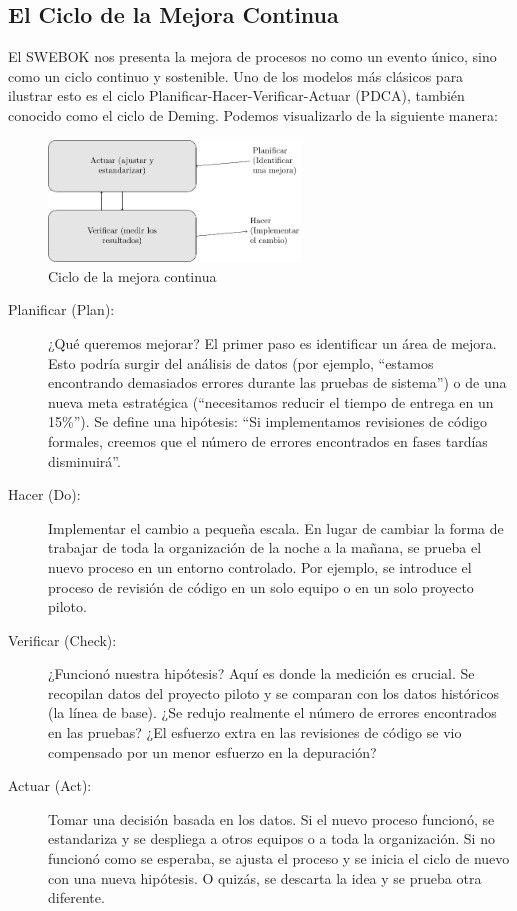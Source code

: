\subsection*{El Ciclo de la Mejora Continua}
El SWEBOK nos presenta la mejora de procesos no como un evento único, sino como un ciclo continuo y sostenible. 
Uno de los modelos más clásicos para ilustrar esto es el ciclo Planificar-Hacer-Verificar-Actuar (PDCA), también conocido como el ciclo de Deming.
Podemos visualizarlo de la siguiente manera:
\begin{figure}[H]
    \centering
    \caption{Ciclo de la mejora continua}
    \label{fig:ciclo_mejora_continua}
    \includegraphics[width=0.6\textwidth]{image/cap2_img2.pdf}
\end{figure}
\begin{description}
  \item[Planificar (Plan):] ¿Qué queremos mejorar? El primer paso es identificar un área de mejora. Esto podría surgir del análisis de datos (por ejemplo, ``estamos encontrando demasiados errores durante las pruebas de sistema'') o de una nueva meta estratégica (``necesitamos reducir el tiempo de entrega en un 15\%''). Se define una hipótesis: ``Si implementamos revisiones de código formales, creemos que el número de errores encontrados en fases tardías disminuirá''.

  \item[Hacer (Do):] Implementar el cambio a pequeña escala. En lugar de cambiar la forma de trabajar de toda la organización de la noche a la mañana, se prueba el nuevo proceso en un entorno controlado. Por ejemplo, se introduce el proceso de revisión de código en un solo equipo o en un solo proyecto piloto.

  \item[Verificar (Check):] ¿Funcionó nuestra hipótesis? Aquí es donde la medición es crucial. Se recopilan datos del proyecto piloto y se comparan con los datos históricos (la línea de base). ¿Se redujo realmente el número de errores encontrados en las pruebas? ¿El esfuerzo extra en las revisiones de código se vio compensado por un menor esfuerzo en la depuración?

  \item[Actuar (Act):] Tomar una decisión basada en los datos. Si el nuevo proceso funcionó, se estandariza y se despliega a otros equipos o a toda la organización. Si no funcionó como se esperaba, se ajusta el proceso y se inicia el ciclo de nuevo con una nueva hipótesis. O quizás, se descarta la idea y se prueba otra diferente.
\end{description}
